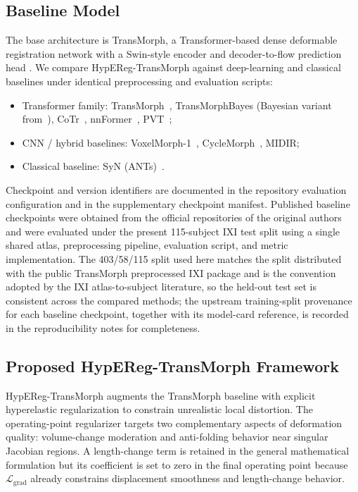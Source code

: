\documentclass[jimaging,article,submit,pdftex,moreauthors]{Definitions/mdpi}
\begin{document}
\subsection{Baseline Model}
The base architecture is TransMorph, a Transformer-based dense deformable registration network with a Swin-style encoder and decoder-to-flow prediction head \cite{chen2022transmorph,liu2021swin}. We compare HypEReg-TransMorph against deep-learning and classical baselines under identical preprocessing and evaluation scripts:
\begin{itemize}
\item Transformer family: TransMorph~\cite{chen2022transmorph}, TransMorphBayes (Bayesian variant from~\cite{chen2022transmorph}), CoTr~\cite{xie2021cotr}, nnFormer~\cite{zhou2023nnformer}, PVT~\cite{wang2021pvt};
\item CNN / hybrid baselines: VoxelMorph-1~\cite{balakrishnan2019voxelmorph}, CycleMorph~\cite{kim2021cyclemorph}, MIDIR;
\item Classical baseline: SyN (ANTs)~\cite{avants2008ants}.
\end{itemize}
Checkpoint and version identifiers are documented in the repository evaluation configuration and in the supplementary checkpoint manifest. Published baseline checkpoints were obtained from the official repositories of the original authors and were evaluated under the present 115-subject IXI test split using a single shared atlas, preprocessing pipeline, evaluation script, and metric implementation. The 403/58/115 split used here matches the split distributed with the public TransMorph preprocessed IXI package and is the convention adopted by the IXI atlas-to-subject literature, so the held-out test set is consistent across the compared methods; the upstream training-split provenance for each baseline checkpoint, together with its model-card reference, is recorded in the reproducibility notes for completeness.

\subsection{Proposed HypEReg-TransMorph Framework}
HypEReg-TransMorph augments the TransMorph baseline with explicit hyperelastic regularization to constrain unrealistic local distortion. The operating-point regularizer targets two complementary aspects of deformation quality: volume-change moderation and anti-folding behavior near singular Jacobian regions. A length-change term is retained in the general mathematical formulation but its coefficient is set to zero in the final operating point because \(\mathcal{L}_{\mathrm{grad}}\) already constrains displacement smoothness and length-change behavior.
\end{document}
